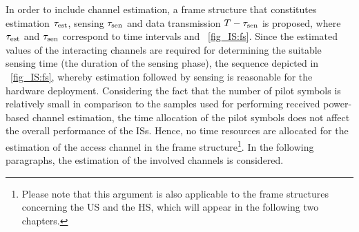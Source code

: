 In order to include channel estimation, a frame structure that constitutes estimation $\tau_{\text{est}}$, sensing $\tau_{\text{sen}}$ and data transmission $T - \tau_{\text{sen}}$ is proposed, where $\tau_{\text{est}}$ and $\tau_{\text{sen}}$ correspond to time intervals and  \figurename~{\ref{fig_IS:fs}}. Since the estimated values of the interacting channels are required for determining the suitable sensing time (the duration of the sensing phase), the sequence depicted in \figurename~{\ref{fig_IS:fs}}, whereby estimation followed by sensing is reasonable for the hardware deployment. 
Considering the fact that the number of pilot symbols is relatively small in comparison to the samples used for performing received power-based channel estimation, the time allocation of the pilot symbols does not affect the overall performance of the ISs. Hence, no time resources are allocated for the estimation of the access channel in the frame structure\footnote{Please note that this argument is also applicable to the frame structures concerning the US and the HS, which will appear in the following two chapters.}. In the following paragraphs, the estimation of the involved channels is considered. 


